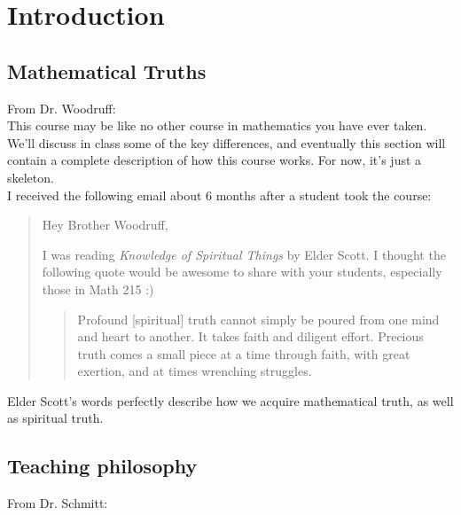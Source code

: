 \documentclass[letterpaper,oneside]{book}%
\newif\ifIntro
\theoremstyle{plain}
\theoremstyle{box}
\theoremstyle{problem}
\begin{document}

\ifIntro
\chapter*{Introduction}
\section*{Mathematical Truths}
From Dr. Woodruff:\\

\noindent This course may be like no other course in mathematics you have ever taken.  We'll discuss in class some of the key differences, and eventually this section will contain a complete description of how this course works. For now, it's just a skeleton.\\

\noindent I received the following email about 6 months after a student took the course:

\begin{quote}
Hey Brother Woodruff,

I was reading {\it Knowledge of Spiritual Things} by Elder Scott.
I thought the following quote would be awesome to share with your
students, especially those in Math 215 :)

\begin{quote}
Profound [spiritual] truth cannot simply be poured
from one mind and heart to another. It takes faith
and diligent effort. Precious truth comes a small
piece at a time through faith, with great exertion,
and at times wrenching struggles.
\end{quote}
\end{quote}
Elder Scott's words perfectly describe how we acquire mathematical truth, as well as spiritual truth. 

\newpage

\section*{Teaching philosophy} 
From Dr. Schmitt:\\
\end{document}
